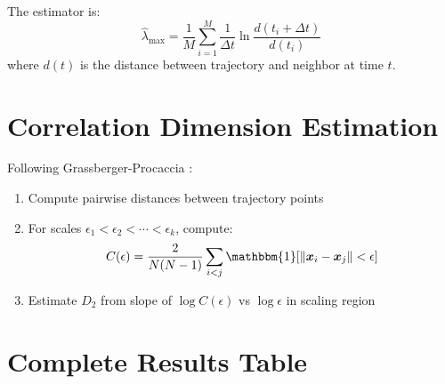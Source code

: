 \documentclass[10pt]{article} %
\theoremstyle{plain}
\theoremstyle{definition}
\theoremstyle{remark}
\renewcommand{\norm}[1]{\left\lVert#1\right\rVert}
\renewcommand{\vect}[1]{\bm{#1}}
\begin{document}
The estimator is:
\begin{equation}
    \hat{\lambda}_{\max} = \frac{1}{M} \sum_{i=1}^{M} \frac{1}{\Delta t} \ln \frac{d(t_i + \Delta t)}{d(t_i)}
\end{equation}
where $d(t)$ is the distance between trajectory and neighbor at time $t$.

\section{Correlation Dimension Estimation}

Following Grassberger-Procaccia \cite{grassberger1983}:

\begin{enumerate}
    \item Compute pairwise distances between trajectory points
    \item For scales $\epsilon_1 < \epsilon_2 < \cdots < \epsilon_k$, compute:
    \begin{equation}
        C(\epsilon) = \frac{2}{N(N-1)} \sum_{i<j} \mathbbm{1}[\norm{\vect{x}_i - \vect{x}_j} < \epsilon]
    \end{equation}
    \item Estimate $D_2$ from slope of $\log C(\epsilon)$ vs $\log \epsilon$ in scaling region
\end{enumerate}

\section{Complete Results Table}
\end{document}
